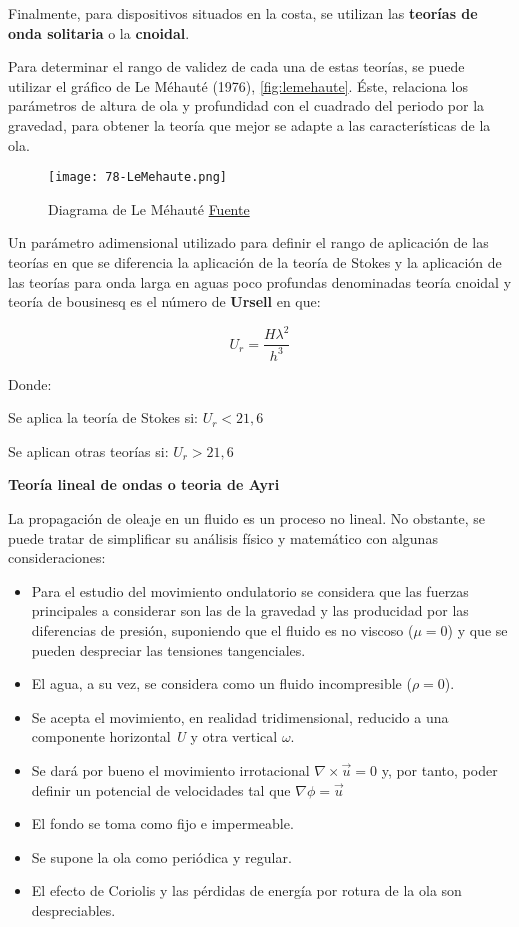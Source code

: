 Finalmente, para dispositivos situados en la costa, se utilizan las
\textbf{teorías de onda solitaria} o la \textbf{cnoidal}.

Para determinar el rango de validez de cada una de estas teorías, se
puede utilizar el gráfico de Le Méhauté (1976), \autoref{fig:lemehaute}. Éste, relaciona los parámetros de altura de ola y profundidad con el cuadrado del periodo por la gravedad, para obtener la teoría que mejor se adapte a las
características de la ola.

\begin{figure}
\centering
\texttt{[image: 78-LeMehaute.png]}
\caption[Diagrama de Le Méhauté]{Diagrama de Le Méhauté \href{http://upcommons.upc.edu/pfc/handle/2099.1/13595}{Fuente}}
\label{fig:lemehaute}
\end{figure}

Un parámetro adimensional utilizado para definir el rango de aplicación
de las teorías en que se diferencia la aplicación de la teoría de Stokes
y la aplicación de las teorías para onda larga en aguas poco profundas
denominadas teoría cnoidal y teoría de bousinesq es el número de
\textbf{Ursell} en que:

\[U_r= \frac{H\lambda^2}{h^3}\]

Donde:

 Se aplica la teoría de Stokes si: \(U_r<21,6\)

 Se aplican otras teorías si: \(U_r>21,6\)

\textbf{Teoría lineal de ondas o teoria de
Ayri}

La propagación de oleaje en un fluido es un proceso no lineal. No
obstante, se puede tratar de simplificar su análisis físico y matemático
con algunas consideraciones:

\begin{itemize}
\item
  Para el estudio del movimiento ondulatorio se considera que las
  fuerzas principales a considerar son las de la gravedad y las
  producidad por las diferencias de presión, suponiendo que el fluido es
  no viscoso (\(\mu=0\)) y que se pueden despreciar las tensiones
  tangenciales.
\item
  El agua, a su vez, se considera como un fluido incompresible
  (\(\rho =0\)).
\item
  Se acepta el movimiento, en realidad tridimensional, reducido a una
  componente horizontal \emph{U} y otra vertical \(\omega\).
\item
  Se dará por bueno el movimiento irrotacional
  \(\nabla \times \vec u=0\) y, por tanto, poder definir un potencial de
  velocidades tal que \(\nabla \phi=\vec u\)
\item
  El fondo se toma como fijo e impermeable.
\item
  Se supone la ola como periódica y regular.
\item
  El efecto de Coriolis y las pérdidas de energía por rotura de la ola
  son despreciables.
\end{itemize}

